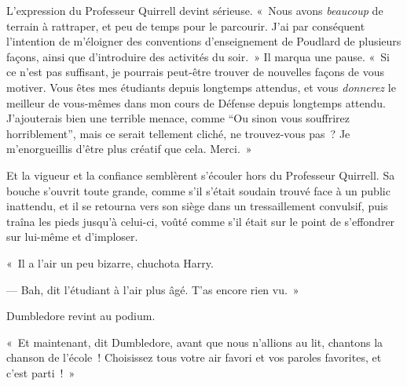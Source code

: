 L'expression du Professeur Quirrell devint sérieuse. «~Nous avons \emph{beaucoup} de terrain à rattraper, et peu de temps pour le parcourir. J'ai par conséquent l'intention de m'éloigner des conventions d'enseignement de Poudlard de plusieurs façons, ainsi que d'introduire des activités du soir.~» Il marqua une pause. «~Si ce n'est pas suffisant, je pourrais peut-être trouver de nouvelles façons de vous motiver. Vous êtes mes étudiants depuis longtemps attendus, et vous \emph{donnerez} le meilleur de vous-mêmes dans mon cours de Défense depuis longtemps attendu. J'ajouterais bien une terrible menace, comme “Ou sinon vous souffrirez horriblement”, mais ce serait tellement cliché, ne trouvez-vous pas~? Je m'enorgueillis d'être plus créatif que cela. Merci.~»

Et la vigueur et la confiance semblèrent s'écouler hors du Professeur Quirrell. Sa bouche s'ouvrit toute grande, comme s'il s'était soudain trouvé face à un public inattendu, et il se retourna vers son siège dans un tressaillement convulsif, puis traîna les pieds jusqu'à celui-ci, voûté comme s'il était sur le point de s'effondrer sur lui-même et d'imploser.

«~Il a l'air un peu bizarre, chuchota Harry.

--- Bah, dit l'étudiant à l'air plus âgé. T'as encore rien vu.~»

Dumbledore revint au podium.

«~Et maintenant, dit Dumbledore, avant que nous n'allions au lit, chantons la chanson de l'école~! Choisissez tous votre air favori et vos paroles favorites, et c'est parti~!~»

